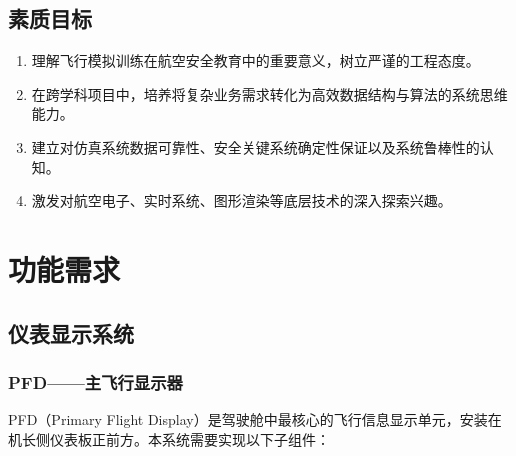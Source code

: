 \documentclass[12pt,a4paper]{ctexart}
\begin{document}
\subsection{素质目标}

\begin{enumerate}[leftmargin=*]
    \item 理解飞行模拟训练在航空安全教育中的重要意义，树立严谨的工程态度。
    \item 在跨学科项目中，培养将复杂业务需求转化为高效数据结构与算法的系统思维能力。
    \item 建立对仿真系统数据可靠性、安全关键系统确定性保证以及系统鲁棒性的认知。
    \item 激发对航空电子、实时系统、图形渲染等底层技术的深入探索兴趣。
\end{enumerate}

\section{功能需求}


\subsection{仪表显示系统}

\subsubsection{PFD——主飞行显示器}

PFD（Primary Flight Display）是驾驶舱中最核心的飞行信息显示单元，安装在机长侧仪表板正前方。本系统需要实现以下子组件：
\end{document}
